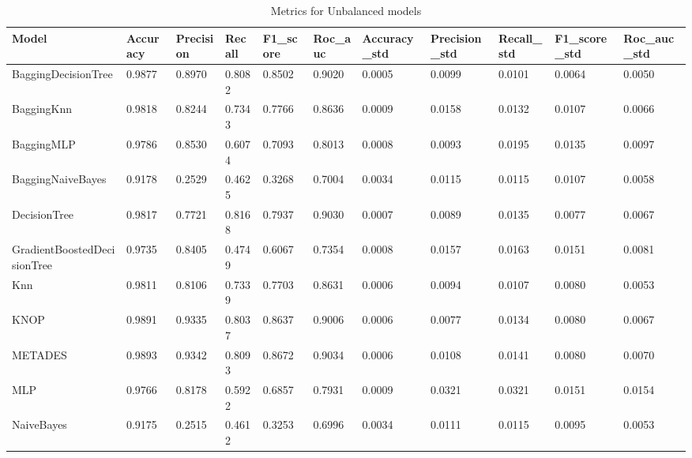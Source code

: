 
\begin{table}[h!]
    \centering
    \caption{Metrics for Unbalanced models}
    \label{tab:Unbalanced_metrics}
    \begin{tabular}{l|l|l|l|l|l|l|l|l|l|l}
\toprule
                      Model &  Accuracy &  Precision &  Recall &  F1\_score &  Roc\_auc &  Accuracy\_std &  Precision\_std &  Recall\_std &  F1\_score\_std &  Roc\_auc\_std \\
\midrule
        BaggingDecisionTree &    0.9877 &     0.8970 &  0.8082 &    0.8502 &   0.9020 &        0.0005 &         0.0099 &      0.0101 &        0.0064 &       0.0050 \\
                 BaggingKnn &    0.9818 &     0.8244 &  0.7343 &    0.7766 &   0.8636 &        0.0009 &         0.0158 &      0.0132 &        0.0107 &       0.0066 \\
                 BaggingMLP &    0.9786 &     0.8530 &  0.6074 &    0.7093 &   0.8013 &        0.0008 &         0.0093 &      0.0195 &        0.0135 &       0.0097 \\
          BaggingNaiveBayes &    0.9178 &     0.2529 &  0.4625 &    0.3268 &   0.7004 &        0.0034 &         0.0115 &      0.0115 &        0.0107 &       0.0058 \\
               DecisionTree &    0.9817 &     0.7721 &  0.8168 &    0.7937 &   0.9030 &        0.0007 &         0.0089 &      0.0135 &        0.0077 &       0.0067 \\
GradientBoostedDecisionTree &    0.9735 &     0.8405 &  0.4749 &    0.6067 &   0.7354 &        0.0008 &         0.0157 &      0.0163 &        0.0151 &       0.0081 \\
                        Knn &    0.9811 &     0.8106 &  0.7339 &    0.7703 &   0.8631 &        0.0006 &         0.0094 &      0.0107 &        0.0080 &       0.0053 \\
                       KNOP &    0.9891 &     0.9335 &  0.8037 &    0.8637 &   0.9006 &        0.0006 &         0.0077 &      0.0134 &        0.0080 &       0.0067 \\
                    METADES &    0.9893 &     0.9342 &  0.8093 &    0.8672 &   0.9034 &        0.0006 &         0.0108 &      0.0141 &        0.0080 &       0.0070 \\
                        MLP &    0.9766 &     0.8178 &  0.5922 &    0.6857 &   0.7931 &        0.0009 &         0.0321 &      0.0321 &        0.0151 &       0.0154 \\
                 NaiveBayes &    0.9175 &     0.2515 &  0.4612 &    0.3253 &   0.6996 &        0.0034 &         0.0111 &      0.0115 &        0.0095 &       0.0053 \\

\end{tabular}
\end{table}
